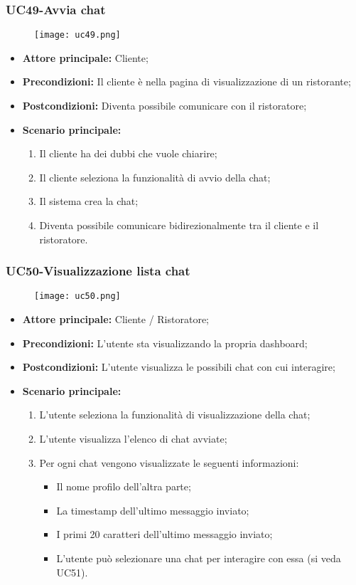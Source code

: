 \pagebreak
\subsubsection{UC49-Avvia chat}
\begin{figure}[h] \texttt{[image: uc49.png]} \end{figure}
\begin{itemize}
\item \textbf{Attore principale:} Cliente;
\item \textbf{Precondizioni:} Il cliente è nella pagina di visualizzazione di un ristorante;
\item \textbf{Postcondizioni:} Diventa possibile comunicare con il ristoratore;
\item \textbf{Scenario principale:}
\begin{enumerate}
    \item Il cliente ha dei dubbi che vuole chiarire;
    \item Il cliente seleziona la funzionalità di avvio della chat;
    \item Il sistema crea la chat;
    \item Diventa possibile comunicare bidirezionalmente tra il cliente e il ristoratore.
\end{enumerate}
\end{itemize}

\subsubsection{UC50-Visualizzazione lista chat}
\begin{figure}[h] \texttt{[image: uc50.png]} \end{figure}
\begin{itemize}
\item \textbf{Attore principale:} Cliente / Ristoratore;
\item \textbf{Precondizioni:} L'utente sta visualizzando la propria dashboard;
\item \textbf{Postcondizioni:} L'utente visualizza le possibili chat con cui interagire;
\item \textbf{Scenario principale:}
\begin{enumerate}
    \item L'utente seleziona la funzionalità di visualizzazione della chat;
    \item L'utente visualizza l'elenco di chat avviate;
    \item Per ogni chat vengono visualizzate le seguenti informazioni:
      \begin{itemize}
        \item Il nome profilo dell'altra parte;
        \item La timestamp dell'ultimo messaggio inviato;
        \item I primi 20 caratteri dell'ultimo messaggio inviato;
\item L'utente può selezionare una chat per interagire con essa (si veda UC51).
      \end{itemize}
\end{enumerate}
\end{itemize}

